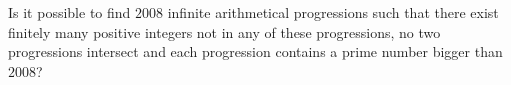 Is it possible to find $2008$ infinite arithmetical progressions such that there exist finitely many positive integers not in any of these progressions, no two progressions intersect and each progression contains a prime number bigger than $2008$?